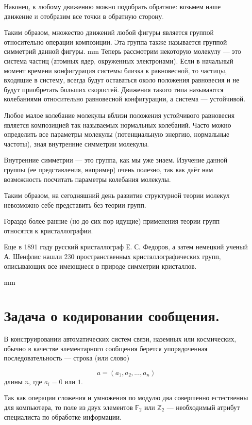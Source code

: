 \documentclass[12pt,english,russian]{article}
\begin{document}
	Наконец, к любому движению можно подобрать обратное: возьмем 
	наше движение и отобразим все точки в обратную сторону.

	Таким образом, множество движений любой фигуры является
	группой относительно операции композиции. Эта группа также
	называется группой симметрий данной фигуры.
	 mm
	Теперь рассмотрим некоторую молекулу --- это система частиц
	(атомных ядер, окруженных электронами). Если в начальный момент 
	времени конфигурация системы близка к равновесной, то
	частицы, входящие в систему, всегда будут оставаться около положения 
	равновесия и не будут приобретать больших скоростей.
	Движения такого типа называются колебаниями относительно
	равновесной конфигурации, а система --- устойчивой.

	Любое малое колебание молекулы вблизи положения устойчивого 
	равновесия является композицией так называемых нормальных 
	колебаний. Часто можно определить все параметры молекулы 
	(потенциальную энергию, нормальные частоты), зная внутренние 
	симметрии молекулы.

	Внутренние симметрии --- это группа, как мы уже знаем. 
	Изучение данной группы (ее представления, например) очень полезно, 
	так как даёт нам возможность посчитать параметры колебания 
	молекулы.

	Таким образом, на сегодняшний день развитие структурной
	теории молекул невозможно себе представить без теории групп.

	Гораздо более ранние (но до сих пор идущие) применения теории 
	групп относятся к кристаллографии.

	Еще в 1891 году русский кристаллограф Е. С. Федоров, а затем
	немецкий ученый А. Шенфлис нашли 230 пространственных кристаллографических 
	групп, описывающих все имеющиеся в природе 
	симметрии кристаллов.

	 mm
	\section{\bf Задача о кодировании сообщения.}

	В конструировании автоматических систем связи, наземных
	или космических, обычно в качестве элементарного сообщения
	берется упорядоченная последовательность --- строка (или слово)

	$$a = (a_1,a_2,\dots ,a_n)$$
	длины $n$, где $a_i = 0$ или $1$.

	Так как операции сложения и умножения по модулю два совершенно 
	естественны для компьютера, то поле из двух элементов
	$\mathbb F_2$ или $\mathbb Z_2$ --- необходимый атрибут специалиста по обработке информации.
\end{document}
